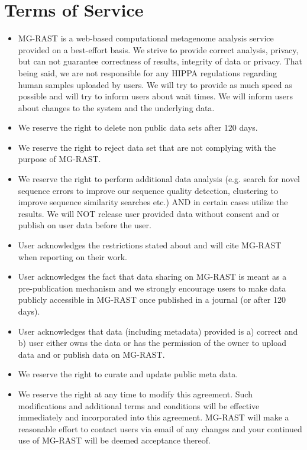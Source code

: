 \documentclass[12pt,fullpage]{report}
\begin{document}
\chapter{Terms of Service}

\begin{itemize}
\item MG-RAST is a web-based computational metagenome analysis service provided on a best-effort basis. We strive to provide correct analysis, privacy, but can not guarantee correctness of results, integrity of data or privacy. That being said, we are not responsible for any HIPPA regulations regarding human samples uploaded by users. We will try to provide as much speed as possible and will try to inform users about wait times. We will inform users about changes to the system and the underlying data.
\item We reserve the right to delete non public data sets after 120 days.
\item We reserve the right to reject data set that are not complying with the purpose of MG-RAST.
\item We reserve the right to perform additional data analysis (e.g. search for novel sequence errors to improve our sequence quality detection, clustering to improve sequence similarity searches etc.) AND in certain cases utilize the results. We will NOT release user provided data without consent and or publish on user data before the user.
\item User acknowledges the restrictions stated about and will cite MG-RAST when reporting on their work.
\item User acknowledges the fact that data sharing on MG-RAST is meant as a pre-publication mechanism and we strongly encourage users to make data publicly accessible in MG-RAST once published in a journal (or after 120 days).
\item User acknowledges that data (including metadata) provided is a) correct and b) user either owns the data or has the permission of the owner to upload data and or publish data on MG-RAST.
\item We reserve the right to curate and update public meta data.
\item We reserve the right at any time to modify this agreement. Such modifications and additional terms and conditions will be effective immediately and incorporated into this agreement. MG-RAST will make a reasonable effort to contact users via email of any changes and your continued use of MG-RAST will be deemed acceptance thereof.
\end{itemize}
\end{document}
